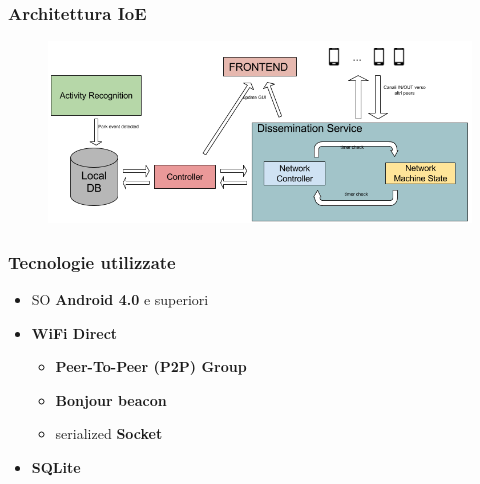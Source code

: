 \documentclass{beamer}
\begin{document}
\begin{frame}
\frametitle{Architettura IoE}
\begin{figure}
\includegraphics[scale=0.25]{img/arch_soft.png}
\end{figure}
\end{frame}

\begin{frame}
\frametitle{Tecnologie utilizzate}
\begin{itemize}
  \item SO \textbf{Android 4.0} e superiori\vspace{5mm}
  \item \textbf{WiFi Direct}
    \begin{itemize}\vspace{1mm}
    \item \textbf{Peer-To-Peer (P2P) Group}\vspace{1mm}
    \item \textbf{Bonjour beacon}\vspace{1mm}
    \item serialized \textbf{Socket}\vspace{5mm}
    \end{itemize}
  \item \textbf{SQLite}\vspace{5mm}
\end{itemize}
\end{frame}
\end{document}
